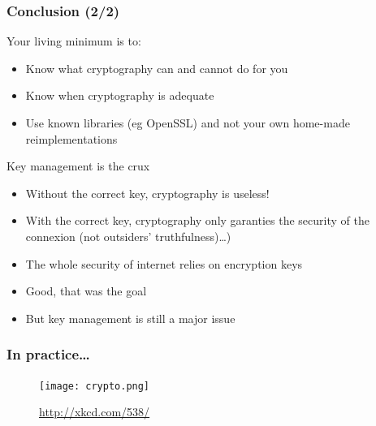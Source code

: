 \documentclass[
hyperref={pdfpagelabels=false}
,xcolor=table
]
{beamer}
\begin{document}
\begin{frame}
  \frametitle{Conclusion (2/2)}
\begin{block}{Your living minimum is to: }
	\begin{itemize}
		\item Know what cryptography can and cannot do for you
		\item Know when cryptography is adequate
		\item Use known libraries (eg OpenSSL) and not your own home-made reimplementations
	\end{itemize}	
\end{block}

\begin{block}{Key management is the crux}
	\begin{itemize}
		\item Without the correct key, cryptography is useless!
		\item With the correct key, cryptography only garanties the security of the connexion (not outsiders' truthfulness)\ldots)
	\end{itemize}
\end{block}

\begin{block}{}
  \begin{itemize}
  \item The whole security of internet relies on encryption keys
  \item Good, that was the goal
  \item But key management is still a major issue
  \end{itemize}
\end{block}
\end{frame}



\begin{frame}
  \frametitle{In practice\ldots}
  \begin{figure}
	\centering
	\texttt{[image: crypto.png]}
	
	\url{http://xkcd.com/538/}
  \end{figure}
\end{frame}
\end{document}
